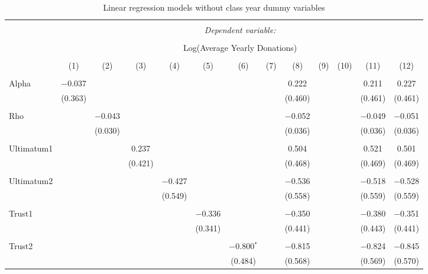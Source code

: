\begin{subtables}
\begin{table}[H] \centering 
  \caption{Linear regression models without class year dummy variables} 
  \label{} 
   \begin{adjustbox}{width=\textwidth}
   \begin{tabular}{@{\extracolsep{5pt}}lcccccccccccc} 
\\[-1.8ex]\hline 
\hline \\[-1.8ex] 
 & \multicolumn{12}{c}{\textit{Dependent variable:}} \\ 
\cline{2-13} 
\\[-1.8ex] & \multicolumn{12}{c}{Log(Average Yearly Donations)} \\ 
\\[-1.8ex] & (1) & (2) & (3) & (4) & (5) & (6) & (7) & (8) & (9) & (10) & (11) & (12)\\ 
\hline \\[-1.8ex] 
 Alpha & $-$0.037 &  &  &  &  &  &  & 0.222 &  &  & 0.211 & 0.227 \\ 
  & (0.363) &  &  &  &  &  &  & (0.460) &  &  & (0.461) & (0.461) \\ 
  & & & & & & & & & & & & \\ 
 Rho &  & $-$0.043 &  &  &  &  &  & $-$0.052 &  &  & $-$0.049 & $-$0.051 \\ 
  &  & (0.030) &  &  &  &  &  & (0.036) &  &  & (0.036) & (0.036) \\ 
  & & & & & & & & & & & & \\ 
 Ultimatum1 &  &  & 0.237 &  &  &  &  & 0.504 &  &  & 0.521 & 0.501 \\ 
  &  &  & (0.421) &  &  &  &  & (0.468) &  &  & (0.469) & (0.469) \\ 
  & & & & & & & & & & & & \\ 
 Ultimatum2 &  &  &  & $-$0.427 &  &  &  & $-$0.536 &  &  & $-$0.518 & $-$0.528 \\ 
  &  &  &  & (0.549) &  &  &  & (0.558) &  &  & (0.559) & (0.559) \\ 
  & & & & & & & & & & & & \\ 
 Trust1 &  &  &  &  & $-$0.336 &  &  & $-$0.350 &  &  & $-$0.380 & $-$0.351 \\ 
  &  &  &  &  & (0.341) &  &  & (0.441) &  &  & (0.443) & (0.441) \\ 
  & & & & & & & & & & & & \\ 
 Trust2 &  &  &  &  &  & $-$0.800$^{*}$ &  & $-$0.815 &  &  & $-$0.824 & $-$0.845 \\ 
  &  &  &  &  &  & (0.484) &  & (0.568) &  &  & (0.569) & (0.570) \\ 

\end{tabular}
\end{adjustbox}
\end{table}
\end{subtables}
